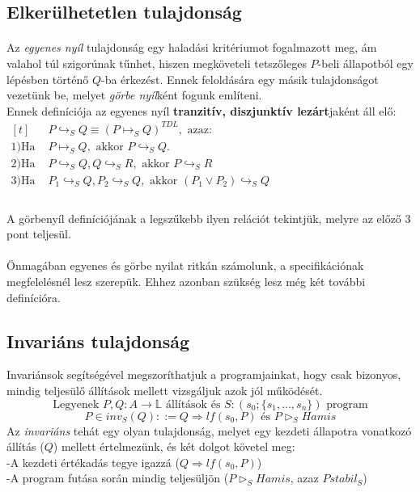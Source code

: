 \documentclass[12pt]{article}
\begin{document}
	\subsection{Elkerülhetetlen tulajdonság}
	\paragraph{} Az \textit{egyenes nyíl} tulajdonság egy haladási kritériumot fogalmazott meg, ám valahol túl szigorúnak tűnhet, hiszen megköveteli tetszőleges $P$-beli állapotból egy lépésben történő $Q$-ba érkezést. Ennek feloldására egy másik tulajdonságot vezetünk be, melyet \textit{görbe nyíl}ként fogunk említeni.\\
	Ennek definíciója az egyenes nyíl \textbf{tranzitív, diszjunktív lezárt}jaként áll elő:\\
	$
	\begin{aligned}[t]
	&P \hookrightarrow_S Q \equiv (P\mapsto_S Q)^{TDL}, \text{ azaz:}\\
	1) \text{Ha } &P \mapsto_S Q, \text{ akkor } P \hookrightarrow_S Q.\\
	2) \text{Ha } &P\hookrightarrow_S Q, Q\hookrightarrow_S R, \text{ akkor } P \hookrightarrow_S R\\
	3) \text{Ha } &P_1\hookrightarrow_S Q, P_2\hookrightarrow_S Q, \text{ akkor } (P_1 \lor P_2) \hookrightarrow_S Q\\
	\end{aligned}
	$
	\paragraph{}
	A görbenyíl definíciójának a legszűkebb ilyen relációt tekintjük, melyre az előző 3 pont teljesül.
	\paragraph{} Önmagában egyenes és görbe nyilat ritkán számolunk, a specifikációnak megfelelésnél lesz szerepük. Ehhez azonban szükség lesz még két további definícióra.
	\subsection{Invariáns tulajdonság}
	Invariánsok segítségével megszoríthatjuk a programjainkat, hogy csak bizonyos, mindig teljesülő állítások mellett vizsgáljuk azok jól működését.
	$$\text{Legyenek }P,Q: A \rightarrow \mathbb{L} \text{ állítások és }S: (s_0; \{s_1, \dots, s_n\})\text{ program}$$
	$$P \in inv_S(Q) ::= Q \Rightarrow lf(s_0, P) \text{ és } P\vartriangleright_S Hamis$$
	Az \textit{invariáns} tehát egy olyan tulajdonság, melyet egy kezdeti állapotra vonatkozó állítás ($Q$) mellett értelmezünk, és két dolgot követel meg:\\
	-A kezdeti értékadás tegye igazzá ($Q\Rightarrow lf(s_0, P)$)\\
	-A program futása során mindig teljesüljön ($P \vartriangleright_S Hamis$, azaz $P stabil_S$)
\end{document}
